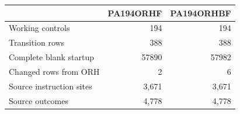 \begin{tabular}{lrr}
\toprule & PA194ORHF & PA194ORHBF\\\midrule
Working controls & 194 & 194\\
Transition rows & 388 & 388\\
Complete blank startup & 57890 & 57982\\
Changed rows from ORH & 2 & 6\\
Source instruction sites & 3,671 & 3,671\\
Source outcomes & 4,778 & 4,778\\
\bottomrule\end{tabular}
